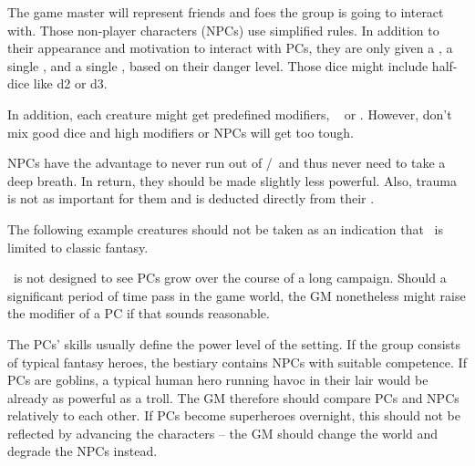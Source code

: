 {		\noindent
		The game master will represent friends and foes the group is going to interact with. Those non-player characters (NPCs) use simplified rules. In addition to their appearance and motivation to interact with PCs, they are only given a \HD, a single \AD, and a single \RD, based on their danger level. Those dice might include half-dice like d2 or d3.

		\nipajinTableNSC

		\noindent
		In addition, each creature might get predefined modifiers, \eg\  or . However, don't mix good dice and high modifiers or NPCs will get too tough.

		NPCs have the advantage to never run out of \AD/\RD\ and thus never need to take a deep breath. In return, they should be made slightly less powerful. Also, trauma is not as important for them and is deducted directly from their \HD.


		\noindent
		The following example creatures should not be taken as an indication that \nipajin\ is limited to classic fantasy.

		\nipajinTableBestiary


		\noindent
		\nipajin\ is not designed to see PCs grow over the course of a long campaign. Should a significant period of time pass in the game world, the GM nonetheless might raise the modifier of a PC if that sounds reasonable.

		The PCs' skills usually define the power level of the setting. If the group consists of typical fantasy heroes, the bestiary contains NPCs with suitable competence. If PCs are goblins, a typical human hero running havoc in their lair would be already as powerful as a troll. The GM therefore should compare PCs and NPCs relatively to each other. If PCs become superheroes overnight, this should not be reflected by advancing the characters -- the GM should change the world and degrade the NPCs instead.

}
